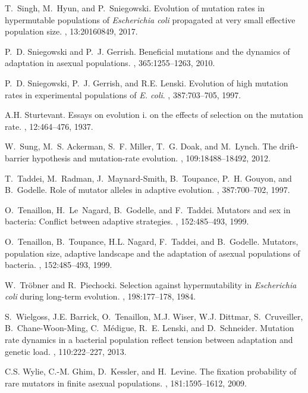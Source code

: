 \documentclass[preprint,12pt,number]{elsarticle}
\begin{document}
\begin{thebibliography}{10}
T.~Singh, M.~Hyun, and P.~Sniegowski.
\newblock Evolution of mutation rates in hypermutable populations of
  \emph{Escherichia coli} propagated at very small effective population size.
, 13:20160849, 2017.

P.~D. Sniegowski and P.~J. Gerrish.
\newblock Beneficial mutations and the dynamics of adaptation in asexual
  populations.
, 365:1255--1263, 2010.

P.~D. Sniegowski, P.~J. Gerrish, and R.E. Lenski.
\newblock Evolution of high mutation rates in experimental populations of
  \emph{ E. coli}.
, 387:703--705, 1997.

A.H. Sturtevant.
\newblock Essays on evolution i. on the effects of selection on the mutation
  rate.
, 12:464--476, 1937.

W.~Sung, M.~S. Ackerman, S.~F. Miller, T.~G. Doak, and M.~Lynch.
\newblock The drift-barrier hypothesis and mutation-rate evolution.
, 109:18488--18492, 2012.

T.~Taddei, M.~Radman, J.~Maynard-Smith, B.~Toupance, P.~H. Gouyon, and
  B.~Godelle.
\newblock Role of mutator alleles in adaptive evolution.
, 387:700--702, 1997.

O.~Tenaillon, H.~Le~Nagard, B.~Godelle, and F.~Taddei.
\newblock Mutators and sex in bacteria: Conflict between adaptive strategies.
, 152:485--493, 1999.

O.~Tenaillon, B.~Toupance, H.L. Nagard, F.~Taddei, and B.~Godelle.
\newblock Mutators, population size, adaptive landscape and the adaptation of
  asexual populations of bacteria.
, 152:485--493, 1999.

W.~Tr{\"o}bner and R.~Piechocki.
\newblock Selection against hypermutability in {{\it Escherichia coli}} during
  long-term evolution.
, 198:177--178, 1984.

S.~Wielgoss, J.E. Barrick, O.~Tenaillon, M.J. Wiser, W.J. Dittmar,
  S.~Cruveiller, B.~Chane-Woon-Ming, C.~M{\'e}digue, R.~E. Lenski, and
  D.~Schneider.
\newblock Mutation rate dynamics in a bacterial population reflect tension
  between adaptation and genetic load.
, 110:222--227, 2013.

C.S. Wylie, C.-M. Ghim, D.~Kessler, and H.~Levine.
\newblock The fixation probability of rare mutators in finite asexual
  populations.
, 181:1595--1612, 2009.

\end{thebibliography}



\end{document}
